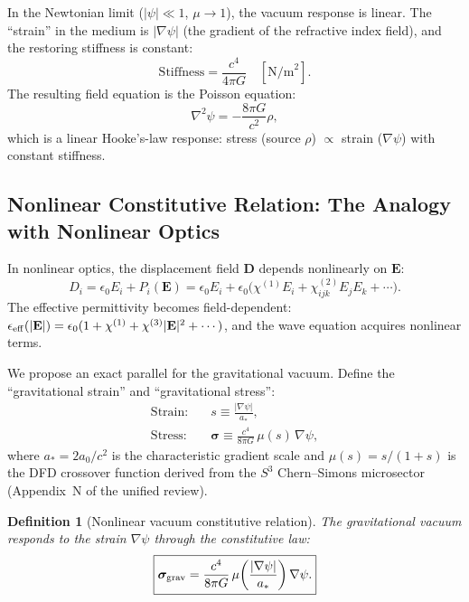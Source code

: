 \documentclass[11pt]{article}
\newtheorem{definition}[theorem]{Definition}
\newcommand{\vE}{\mathbf{E}}
\newcommand{\vD}{\mathbf{D}}
\begin{document}
In the Newtonian limit ($|\psi| \ll 1$, $\mu \to 1$), the vacuum
response is linear.  The ``strain'' in the medium is $|\nabla\psi|$
(the gradient of the refractive index field), and the restoring
stiffness is constant:
\begin{equation}
\text{Stiffness} = \frac{c^4}{4\pi G} \quad [\text{N/m}^2].
\end{equation}
The resulting field equation is the Poisson equation:
\begin{equation}
\nabla^2\psi = -\frac{8\pi G}{c^2}\rho,
\end{equation}
which is a linear Hooke's-law response: stress (source $\rho$)
$\propto$ strain ($\nabla\psi$) with constant stiffness.

\subsection{Nonlinear Constitutive Relation: The Analogy with Nonlinear Optics}

In nonlinear optics, the displacement field $\vD$ depends nonlinearly
on $\vE$:
\begin{equation}
D_i = \epsilon_0 E_i + P_i(\vE) = \epsilon_0 E_i + \epsilon_0\bigl(\chi^{(1)} E_i + \chi^{(2)}_{ijk} E_j E_k + \cdots\bigr).
\end{equation}
The effective permittivity becomes field-dependent:
$\epsilon_{\rm eff}(|\vE|) = \epsilon_0(1 + \chi^{(1)} + \chi^{(3)}|\vE|^2 + \cdots)$,
and the wave equation acquires nonlinear terms.

We propose an exact parallel for the gravitational vacuum.
Define the ``gravitational strain'' and ``gravitational stress'':
\begin{align}
\text{Strain:} \quad & s \equiv \frac{|\nabla\psi|}{a_*}, \label{eq:strain-def} \\
\text{Stress:} \quad & \bm{\sigma} \equiv \frac{c^4}{8\pi G}\,\mu(s)\,\nabla\psi, \label{eq:stress-def}
\end{align}
where $a_* = 2a_0/c^2$ is the characteristic gradient scale and
$\mu(s) = s/(1+s)$ is the DFD crossover function derived from
the $S^3$ Chern--Simons microsector (Appendix~N of the unified review).

\begin{definition}[Nonlinear vacuum constitutive relation]
The gravitational vacuum responds to the strain $\nabla\psi$ through
the constitutive law:
\begin{equation}
\boxed{
\bm{\sigma}_{\rm grav} = \frac{c^4}{8\pi G}\,\mu\!\left(\frac{|\nabla\psi|}{a_*}\right)\nabla\psi.
}
\label{eq:constitutive-nonlinear}
\end{equation}
\end{definition}
\end{document}
